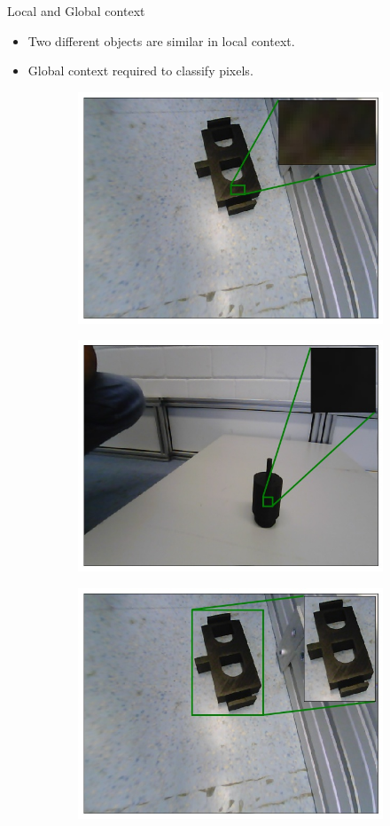 \documentclass{beamer}
\begin{document}
\begin{frame}{Local and Global context}

	\begin{small}
		\begin{itemize}
			\item Two different objects are similar in local context.
			\item Global context required to classify pixels.
		\end{itemize}
	\end{small}

	\begin{figure}[h]
		\centering
		\begin{subfigure}{.49\textwidth}
			\centering
			\includegraphics[width=.6\linewidth]{images/em_01_context_l}
			\label{Fig:em01l}
		\end{subfigure}
		\begin{subfigure}{.49\textwidth}
			\centering
			\includegraphics[width=.6\linewidth]{images/motor_context_l}
			\label{Fig:motorl}
		\end{subfigure}
		\begin{subfigure}{.49\textwidth}
			\centering
			\includegraphics[width=.6\linewidth]{images/em_01_context_g}

\end{subfigure}
\end{figure}
\end{frame}
\end{document}
